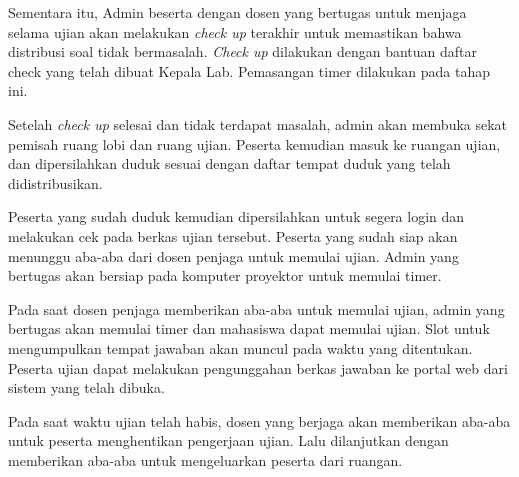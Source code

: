         Sementara itu, Admin beserta dengan dosen yang bertugas untuk menjaga selama ujian akan melakukan \textit{check up} terakhir untuk memastikan bahwa distribusi soal tidak bermasalah. \textit{Check up} dilakukan dengan bantuan daftar check yang telah dibuat Kepala Lab. Pemasangan timer dilakukan pada tahap ini.
        
        Setelah \textit{check up} selesai dan tidak terdapat masalah, admin akan membuka sekat pemisah ruang lobi dan ruang ujian. Peserta kemudian masuk ke ruangan ujian, dan dipersilahkan duduk sesuai dengan daftar tempat duduk yang telah didistribusikan.
        
        Peserta yang sudah duduk kemudian dipersilahkan untuk segera login dan melakukan cek pada berkas ujian tersebut. Peserta yang sudah siap akan menunggu aba-aba dari dosen penjaga untuk memulai ujian. Admin yang bertugas akan bersiap pada komputer proyektor untuk memulai timer.
        
        Pada saat dosen penjaga memberikan aba-aba untuk memulai ujian, admin yang bertugas akan memulai timer dan mahasiswa dapat memulai ujian. Slot untuk mengumpulkan tempat jawaban akan muncul pada waktu yang ditentukan. Peserta ujian dapat melakukan pengunggahan berkas jawaban ke portal web dari sistem yang telah dibuka.
        
        Pada saat waktu ujian telah habis, dosen yang berjaga akan memberikan aba-aba untuk peserta menghentikan pengerjaan ujian. Lalu dilanjutkan dengan memberikan aba-aba untuk mengeluarkan peserta dari ruangan.
    
